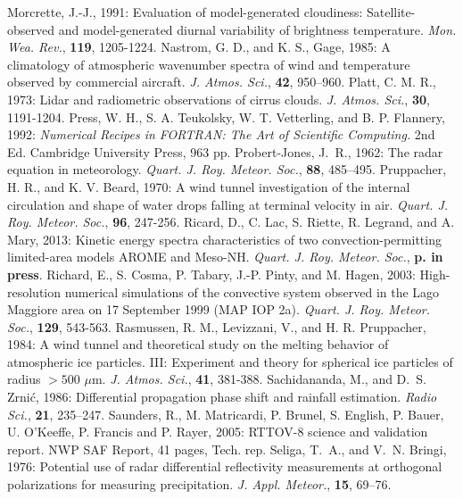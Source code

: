 \decrefname
Morcrette, J.-J., 1991: Evaluation of model-generated cloudiness: 
Satellite-observed and model-generated diurnal variability of
brightness temperature.
      {\it Mon. Wea. Rev.}, 
      {\bf 119},
      1205-1224.
\decrefname
Nastrom, G. D., and K. S., Gage, 1985: A climatology of atmospheric wavenumber
  spectra of wind and temperature observed by commercial aircraft. {\em J.
  Atmos. Sci.}, {\bf 42}, 950--960.
\decrefname
Platt, C. M. R., 1973: Lidar and radiometric observations of cirrus clouds.
      {\it J. Atmos. Sci.}, 
      {\bf 30},
      1191-1204.
\decrefname
Press, W. H., S. A. Teukolsky, W. T. Vetterling, and B. P. Flannery, 1992:
      {\it Numerical Recipes in FORTRAN: The Art of Scientific Computing.}
      2nd Ed.
      Cambridge University Press,
      963 pp.
\decrefname
Probert-Jones, J.~R., 1962: The radar equation in meteorology. {\em Quart. J.
  Roy. Meteor. Soc.}, {\bf 88}, 485--495.
\decrefname
Pruppacher, H. R., and K. V. Beard, 1970: 
      A wind tunnel investigation of the internal circulation and shape of 
      water drops falling at terminal velocity in air.
      {\it Quart. J. Roy. Meteor. Soc.},
      {\bf 96},
      247-256.
\decrefname
Ricard, D., C. Lac, S. Riette, R. Legrand, and A. Mary, 2013: 
Kinetic energy spectra characteristics of two convection-permitting limited-area models AROME and Meso-NH.
{\it Quart. J. Roy. Meteor. Soc.}, {\bf p. in press}.
\decrefname
Richard, E., S. Cosma, P. Tabary, J.-P. Pinty, and M. Hagen, 2003:
      High-resolution numerical simulations of the convective system observed
      in the Lago Maggiore area on 17 September 1999 (MAP IOP 2a).
      {\it Quart. J. Roy. Meteor. Soc.},
      {\bf 129},
      543-563.
\decrefname
Rasmussen, R. M., Levizzani, V., and H. R. Pruppacher, 1984:
      A wind tunnel and theoretical study on the melting behavior of 
      atmospheric ice particles. III: Experiment and theory for spherical 
      ice particles of radius $>500$ $\mu$m.
      {\it J. Atmos. Sci.},
      {\bf 41},
      381-388.
\decrefname
Sachidananda, M., and D.~S. Zrni\'c, 1986: Differential propagation phase shift
  and rainfall estimation. {\em Radio Sci.}, {\bf 21}, 235--247.
\decrefname
Saunders, R., M. Matricardi, P. Brunel, S. English, P. Bauer, U. O'Keeffe, P.
Francis and P. Rayer, 2005: RTTOV-8 science and validation report. NWP SAF
Report, 41 pages, Tech. rep.
\decrefname
Seliga, T.~A., and V.~N. Bringi, 1976: Potential use of radar differential
  reflectivity measurements at orthogonal polarizations for measuring
  precipitation. {\em J. Appl. Meteor.}, {\bf 15}, 69--76.
